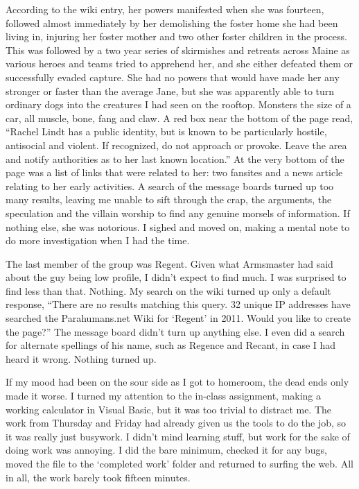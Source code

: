 According to the wiki entry, her powers manifested when she was fourteen, followed almost immediately by her demolishing the foster home she had been living in, injuring her foster mother and two other foster children in the process.  This was followed by a two year series of skirmishes and retreats across Maine as various heroes and teams tried to apprehend her, and she either defeated them or successfully evaded capture.  She had no powers that would have made her any stronger or faster than the average Jane, but she was apparently able to turn ordinary dogs into the creatures I had seen on the rooftop.  Monsters the size of a car, all muscle, bone, fang and claw.  A red box near the bottom of the page read, ``Rachel Lindt has a public identity, but is known to be particularly hostile, antisocial and violent.  If recognized, do not approach or provoke.  Leave the area and notify authorities as to her last known location.''  At the very bottom of the page was a list of links that were related to her:  two fansites and a news article relating to her early activities.  A search of the message boards turned up too many results, leaving me unable to sift through the crap, the arguments, the speculation and the villain worship to find any genuine morsels of information.  If nothing else, she was notorious.  I sighed and moved on, making a mental note to do more investigation when I had the time.



The last member of the group was Regent.  Given what Armsmaster had said about the guy being low profile, I didn't expect to find much.  I was surprised to find less than that.  Nothing.  My search on the wiki turned up only a default response, ``There are no results matching this query.  32 unique IP addresses have searched the Parahumans.net Wiki  for `Regent' in 2011.  Would you like to create the page?''  The message board didn't turn up anything else.  I even did a search for alternate spellings of his name, such as Regence and Recant, in case I had heard it wrong.  Nothing turned up.



If my mood had been on the sour side as I got to homeroom, the dead ends only made it worse.  I turned my attention to the in-class assignment, making a working calculator in Visual Basic, but it was too trivial to distract me.  The work from Thursday and Friday had already given us the tools to do the job, so it was really just busywork.  I didn't mind learning stuff, but work for the sake of doing work was annoying.  I did the bare minimum, checked it for any bugs, moved the file to the `completed work' folder and returned to surfing the web.  All in all, the work barely took fifteen minutes.



